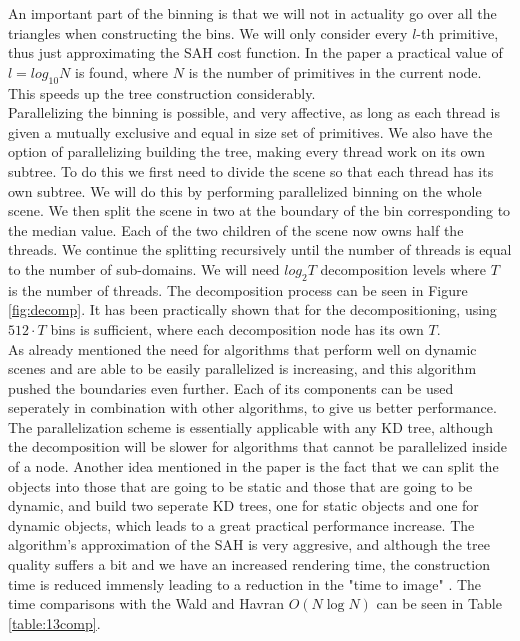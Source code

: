 \documentclass[12pt]{article}
\begin{document}
\indent An important part of the binning is that we will not in actuality go over all the triangles when constructing the bins. We will only consider every $l$-th primitive, thus just approximating the SAH cost function. In the paper a practical value of $l = log_{10}N$ is found, where $N$ is the number of primitives in the current node. This speeds up the tree construction considerably.\\
\indent Parallelizing the binning is possible, and very affective, as long as each thread is given a mutually exclusive and equal in size set of primitives. We also have the option of parallelizing building the tree, making every thread work on its own subtree. To do this we first need to divide the scene so that each thread has its own subtree. We will do this by performing parallelized binning on the whole scene. We then split the scene in two at the boundary of the bin corresponding to the median value. Each of the two children of the scene now owns half the threads. We continue the splitting recursively until the number of threads is equal to the number of sub-domains. We will need $log_2T$ decomposition levels where $T$ is the number of threads. The decomposition process can be seen in Figure \ref{fig:decomp}. It has been practically shown that for the decompositioning, using $512\cdot T$ bins is sufficient, where each decomposition node has its own $T$.\\
\indent As already mentioned the need for algorithms that perform well on dynamic scenes and are able to be easily parallelized is increasing, and this algorithm pushed the boundaries even further. Each of its components can be used seperately in combination with other algorithms, to give us better performance. The parallelization scheme is essentially applicable with any KD tree, although the decomposition will be slower for algorithms that cannot be parallelized inside of a node. Another idea mentioned in the paper is the fact that we can split the objects into those that are going to be static and those that are going to be dynamic, and build two seperate KD trees, one for static objects and one for dynamic objects, which leads to a great practical performance increase. The algorithm's approximation of the SAH is very aggresive, and although the tree quality suffers a bit and we have an increased rendering time, the construction time is reduced immensly leading to a reduction in the "time to image" \cite{shevtsov2007highly}. The time comparisons with the Wald and Havran $O(N\log N)$ can be seen in Table \ref{table:13comp}.
\end{document}
